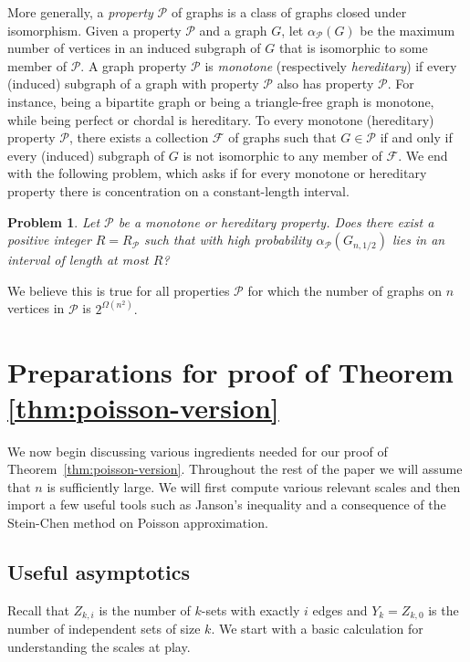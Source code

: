 \documentclass[11pt]{article}
\newtheorem{problem}[theorem]{Problem}
\theoremstyle{definition}
\theoremstyle{remark}
\begin{document}
More generally, a \emph{property} $\mathcal{P}$ of graphs is a class of graphs closed under isomorphism. Given a property $\mathcal{P}$ and a graph $G$, let $\alpha_{\mathcal{P}}(G)$ be the maximum number of vertices in an induced subgraph of $G$ that is isomorphic to some member of $\mathcal{P}$.
A graph property $\mathcal{P}$ is \emph{monotone} (respectively \emph{hereditary}) if every (induced) subgraph of a graph with property $\mathcal{P}$ also has property $\mathcal{P}$. For instance, being a bipartite graph or being a triangle-free graph is monotone, while being perfect or chordal is hereditary. To every monotone (hereditary) property $\mathcal{P}$, there exists a collection $\mathcal{F}$ of graphs such that $G \in \mathcal{P}$ if and only if every (induced) subgraph of $G$ is not isomorphic to any member of $\mathcal{F}$. 
We end with  the following problem, which asks if for every monotone or hereditary property there is concentration on a constant-length interval. 


\begin{problem} \label{conj:main}
    Let $\mathcal{P}$ be a monotone or hereditary property. Does there exist a positive integer $R=R_{\mathcal{P}}$ such that with high probability $\alpha_{\mathcal{P}}(G_{n, 1/2})$ lies in an interval of length at most $R$?
\end{problem}

We believe this is true for all properties $\mathcal{P}$ for which the number of graphs on $n$ vertices in $\mathcal{P}$ is $2^{\Omega(n^2)}.$  

\section{Preparations for proof of Theorem \texorpdfstring{\ref{thm:poisson-version}}{1}}

We now begin discussing various ingredients needed for our proof of Theorem~\ref{thm:poisson-version}.  Throughout the rest of the paper we will assume that $n$ is sufficiently large.  We will first compute various relevant scales and then import a few useful tools such as Janson's inequality and a consequence of the Stein-Chen method on Poisson approximation.

\subsection{Useful asymptotics}

Recall that $Z_{k,i}$ is the number of $k$-sets with exactly $i$ edges and $Y_k = Z_{k,0}$ is the number of independent sets of size $k$.  We start with a basic calculation for understanding the scales at play. 
\end{document}

